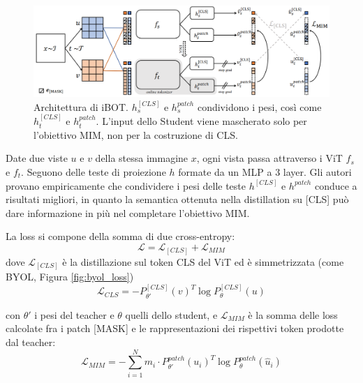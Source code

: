 \begin{figure}[!t]
    \centering
    \includegraphics[width=\textwidth]{Immagini/ssl/arch_ibot.png}
    \caption{Architettura di iBOT. \(h_s^{[CLS]}\) e \(h_s^{patch}\) condividono i pesi, così come \(h_t^{[CLS]}\) e \(h_t^{patch}\). L'input dello Student viene mascherato solo per l'obiettivo MIM, non per la costruzione di CLS.}
    \label{fig:arch_ibot}
\end{figure}

Date due viste \(u\) e \(v\) della stessa immagine \(x\), ogni vista passa attraverso i ViT \(f_s\) e \(f_t\). Seguono delle teste di proiezione \(h\) formate da un MLP a 3 layer. Gli autori provano empiricamente che condividere i pesi delle teste \(h^{[CLS]}\) e \(h^{patch}\) conduce a risultati migliori, in quanto la semantica ottenuta nella distillation su [CLS] può dare informazione in più nel completare l'obiettivo MIM.

La loss si compone della somma di due cross-entropy: 
\begin{equation}
\mathcal{L} = \mathcal{L}_{[CLS]} + \mathcal{L}_{MIM}
\end{equation}
dove \(\mathcal{L}_{[CLS]}\) è la distillazione sul token CLS del ViT ed è simmetrizzata (come BYOL, Figura \ref{fig:byol_loss}) 
\begin{equation}
\mathcal{L}_{CLS} = -P_{\theta'}^{[CLS]}(v)^T \log P_{\theta}^{[CLS]}(u)
\label{eq:loss_cls}
\end{equation} 

con \(\theta'\) i pesi del teacher e \(\theta\) quelli dello student, e \(\mathcal{L}_{MIM}\) è la somma delle loss calcolate fra i patch [MASK] e le rappresentazioni dei rispettivi token prodotte dal teacher:
\begin{equation}
    \mathcal{L}_{MIM} = -\sum_{i=1}^N m_i \cdot P_{\theta'}^{patch}(u_i)^T \log P_{\theta}^{patch}(\hat{u}_i)
    \label{eq:loss_mim}
    \end{equation}

